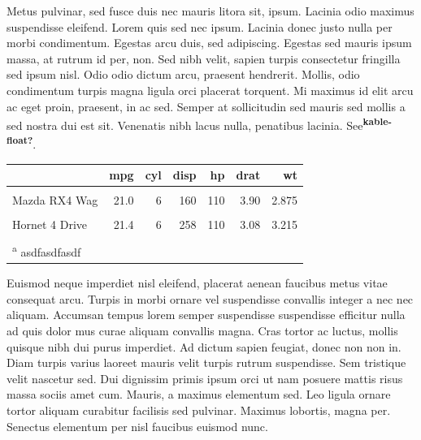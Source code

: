 \documentclass[
  9pt,
  letterpaper,
  DIV=11,
  numbers=noendperiod]{scrartcl}
\begin{document}
Metus pulvinar, sed fusce duis nec mauris litora sit, ipsum. Lacinia
odio maximus suspendisse eleifend. Lorem quis sed nec ipsum. Lacinia
donec justo nulla per morbi condimentum. Egestas arcu duis, sed
adipiscing. Egestas sed mauris ipsum massa, at rutrum id per, non. Sed
nibh velit, sapien turpis consectetur fringilla sed ipsum nisl. Odio
odio dictum arcu, praesent hendrerit. Mollis, odio condimentum turpis
magna ligula orci placerat torquent. Mi maximus id elit arcu ac eget
proin, praesent, in ac sed. Semper at sollicitudin sed mauris sed mollis
a sed nostra dui est sit. Venenatis nibh lacus nulla, penatibus lacinia.
See\textsuperscript{\textbf{kable-float?}}.

\begin{table}\begingroup\fontsize{7}{9}\selectfont

\begin{tabular}[t]{lrrrrrr}
\toprule
  & mpg & cyl & disp & hp & drat & wt\\
\midrule
\cellcolor{gray!6}{Mazda RX4} & \cellcolor{gray!6}{21.0} & \cellcolor{gray!6}{6} & \cellcolor{gray!6}{160} & \cellcolor{gray!6}{110} & \cellcolor{gray!6}{3.90} & \cellcolor{gray!6}{2.620}\\
Mazda RX4 Wag & 21.0 & 6 & 160 & 110 & 3.90 & 2.875\\
\cellcolor{gray!6}{Datsun 710} & \cellcolor{gray!6}{22.8} & \cellcolor{gray!6}{4} & \cellcolor{gray!6}{108} & \cellcolor{gray!6}{93} & \cellcolor{gray!6}{3.85} & \cellcolor{gray!6}{2.320}\\
Hornet 4 Drive & 21.4 & 6 & 258 & 110 & 3.08 & 3.215\\
\cellcolor{gray!6}{Hornet Sportabout} & \cellcolor{gray!6}{18.7} & \cellcolor{gray!6}{8} & \cellcolor{gray!6}{360} & \cellcolor{gray!6}{175} & \cellcolor{gray!6}{3.15} & \cellcolor{gray!6}{3.440}\\
\bottomrule
\multicolumn{7}{l}{\textsuperscript{a} asdfasdfasdf}\\
\end{tabular}
\endgroup{}\end{table}

Euismod neque imperdiet nisl eleifend, placerat aenean faucibus metus
vitae consequat arcu. Turpis in morbi ornare vel suspendisse convallis
integer a nec nec aliquam. Accumsan tempus lorem semper suspendisse
suspendisse efficitur nulla ad quis dolor mus curae aliquam convallis
magna. Cras tortor ac luctus, mollis quisque nibh dui purus imperdiet.
Ad dictum sapien feugiat, donec non non in. Diam turpis varius laoreet
mauris velit turpis rutrum suspendisse. Sem tristique velit nascetur
sed. Dui dignissim primis ipsum orci ut nam posuere mattis risus massa
sociis amet cum. Mauris, a maximus elementum sed. Leo ligula ornare
tortor aliquam curabitur facilisis sed pulvinar. Maximus lobortis, magna
per. Senectus elementum per nisl faucibus euismod nunc.
\end{document}
